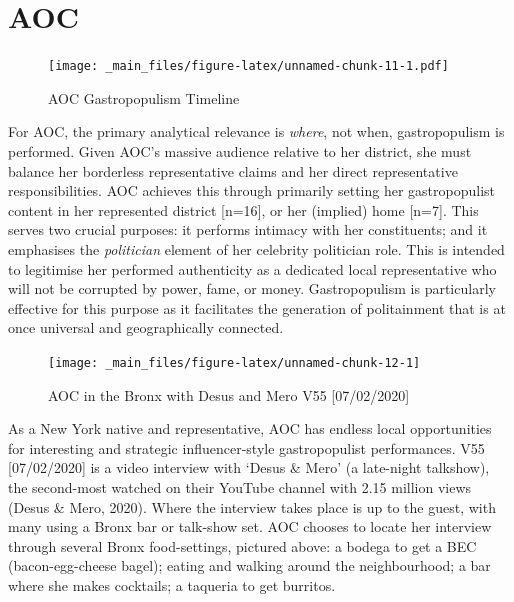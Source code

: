 \documentclass[a4paper, nobind]{templates/ociamthesis}
\begin{document}
\hypertarget{aoc}{%
\section{AOC}\label{aoc}}

\begin{figure}
\centering
\texttt{[image: \_main\_files/figure-latex/unnamed-chunk-11-1.pdf]}
\caption{\label{fig:unnamed-chunk-11}AOC Gastropopulism Timeline}
\end{figure}

For AOC, the primary analytical relevance is \emph{where}, not when, gastropopulism is performed. Given AOC's massive audience relative to her district, she must balance her borderless representative claims and her direct representative responsibilities. AOC achieves this through primarily setting her gastropopulist content in her represented district {[}n=16{]}, or her (implied) home {[}n=7{]}. This serves two crucial purposes: it performs intimacy with her constituents; and it emphasises the \emph{politician} element of her celebrity politician role. This is intended to legitimise her performed authenticity as a dedicated local representative who will not be corrupted by power, fame, or money. Gastropopulism is particularly effective for this purpose as it facilitates the generation of politainment that is at once universal and geographically connected.

\begin{figure}
\texttt{[image: \_main\_files/figure-latex/unnamed-chunk-12-1]} \caption{AOC in the Bronx with Desus and Mero V55 [07/02/2020]}\label{fig:unnamed-chunk-12}
\end{figure}

As a New York native and representative, AOC has endless local opportunities for interesting and strategic influencer-style gastropopulist performances.
V55 {[}07/02/2020{]} is a video interview with `Desus \& Mero' (a late-night talkshow), the second-most watched on their YouTube channel with 2.15 million views (Desus \& Mero, 2020).
Where the interview takes place is up to the guest, with many using a Bronx bar or talk-show set.
AOC chooses to locate her interview through several Bronx food-settings, pictured above: a bodega to get a BEC (bacon-egg-cheese bagel); eating and walking around the neighbourhood; a bar where she makes cocktails; a taqueria to get burritos.
\end{document}
